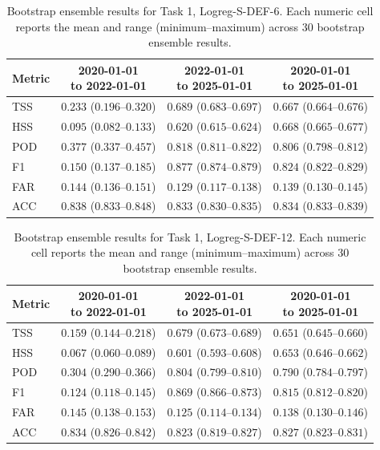 \begin{table}[htbp]
\centering
\small
\caption{Bootstrap ensemble results for Task 1, Logreg-S-DEF-6. Each numeric cell reports the mean and range (minimum--maximum) across 30 bootstrap ensemble results.}
\label{tab:app-task1-logreg-s-def-6}
\begin{tabular}{lccc}
\toprule
Metric & \shortstack{2020-01-01\\to 2022-01-01} & \shortstack{2022-01-01\\to 2025-01-01} & \shortstack{2020-01-01\\to 2025-01-01} \\
\midrule
TSS & $0.233$ ($0.196$--$0.320$) & $0.689$ ($0.683$--$0.697$) & $0.667$ ($0.664$--$0.676$) \\
HSS & $0.095$ ($0.082$--$0.133$) & $0.620$ ($0.615$--$0.624$) & $0.668$ ($0.665$--$0.677$) \\
POD & $0.377$ ($0.337$--$0.457$) & $0.818$ ($0.811$--$0.822$) & $0.806$ ($0.798$--$0.812$) \\
F1 & $0.150$ ($0.137$--$0.185$) & $0.877$ ($0.874$--$0.879$) & $0.824$ ($0.822$--$0.829$) \\
FAR & $0.144$ ($0.136$--$0.151$) & $0.129$ ($0.117$--$0.138$) & $0.139$ ($0.130$--$0.145$) \\
ACC & $0.838$ ($0.833$--$0.848$) & $0.833$ ($0.830$--$0.835$) & $0.834$ ($0.833$--$0.839$) \\
\bottomrule
\end{tabular}
\end{table}
\clearpage

\begin{table}[htbp]
\centering
\small
\caption{Bootstrap ensemble results for Task 1, Logreg-S-DEF-12. Each numeric cell reports the mean and range (minimum--maximum) across 30 bootstrap ensemble results.}
\label{tab:app-task1-logreg-s-def-12}
\begin{tabular}{lccc}
\toprule
Metric & \shortstack{2020-01-01\\to 2022-01-01} & \shortstack{2022-01-01\\to 2025-01-01} & \shortstack{2020-01-01\\to 2025-01-01} \\
\midrule
TSS & $0.159$ ($0.144$--$0.218$) & $0.679$ ($0.673$--$0.689$) & $0.651$ ($0.645$--$0.660$) \\
HSS & $0.067$ ($0.060$--$0.089$) & $0.601$ ($0.593$--$0.608$) & $0.653$ ($0.646$--$0.662$) \\
POD & $0.304$ ($0.290$--$0.366$) & $0.804$ ($0.799$--$0.810$) & $0.790$ ($0.784$--$0.797$) \\
F1 & $0.124$ ($0.118$--$0.145$) & $0.869$ ($0.866$--$0.873$) & $0.815$ ($0.812$--$0.820$) \\
FAR & $0.145$ ($0.138$--$0.153$) & $0.125$ ($0.114$--$0.134$) & $0.138$ ($0.130$--$0.146$) \\
ACC & $0.834$ ($0.826$--$0.842$) & $0.823$ ($0.819$--$0.827$) & $0.827$ ($0.823$--$0.831$) \\
\bottomrule
\end{tabular}
\end{table}
\clearpage

